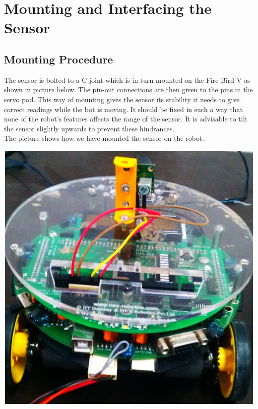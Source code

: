 \documentclass[a4paper,29.6pt]{article}
\begin{document}
\section{Mounting and Interfacing the Sensor}
\subsection{Mounting Procedure}
\begin{small}
The sensor is bolted to a C joint which is in turn mounted on the Fire Bird V as shown in picture below. The pin-out connections are then given to the pins in the servo pod. This way of mounting gives the sensor its stability it needs to give correct readings while the bot is moving. It should be fixed in such a way that none of the robot's features affects the range of the sensor. It is advisable to tilt the sensor slightly upwards to prevent these hindrances. \\

\newpage
The picture shows how we have mounted the sensor on the robot.

\end{small}

\begin{center}
\includegraphics[scale=0.5]{2}
\end{center}
\end{document}

